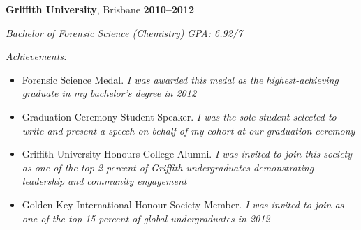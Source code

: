 \textbf{Griffith University}, Brisbane \hfill \textbf{2010--2012} \par
\textit{Bachelor of Forensic Science (Chemistry)} \hfill \textit{GPA: 6.92/7} \par
\vspace{1mm}
\textit{Achievements:} \par
\begin{itemize}
	\item Forensic Science Medal. \textit{I was awarded this medal as the highest-achieving graduate in my bachelor's degree in 2012}
    \item Graduation Ceremony Student Speaker. \textit{I was the sole student selected to write and present a speech on behalf of my cohort at our graduation ceremony}
    \item Griffith University Honours College Alumni. \textit{I was invited to join this society as one of the top 2 percent of Griffith undergraduates demonstrating leadership and community engagement}
    \item Golden Key International Honour Society Member. \textit{I was invited to join as one of the top 15 percent of global undergraduates in 2012}
\end{itemize}\par